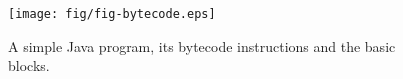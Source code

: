 \begin{figure}[!ht]
\begin{center}
\texttt{[image: fig/fig-bytecode.eps]}
\caption{A simple Java program, its bytecode instructions and the
basic blocks.}\label{fig-bytecode}
\end{center}
\end{figure}


\begin{comment}
\scriptsize
\begin{tabular}{lll}
\begin{minipage}{0.3\textwidth}
\begin{verbatim}

01 public class Vet {
02     int v[];
03     float out;
04
05     float average( int[] in )
06     {
07         v = in;
08         out = 0.0f;
09         int i = 0;
10         try {
11             while ( i < v.length )
12             {
13                 out += v[i];
14                 i++;
15             }
16             out = out / i;
17         }
18         catch( Exception e )
19         {
20             out = 0.0f;
21             i = 0;
22         }
23         finally
24         {
25             v = null;
26         }
27         print( (float) i );
28         return out;
29     }
30
31     public void print( float n )
32     {
33         System.out.print( n + "\n" );
34     }
35 }

\end{verbatim}
\end{minipage}
&
\begin{minipage}{0.3\textwidth}
\begin{verbatim}
0:    aload_0
1:    aload_1
2:    putfield      Vet.v
5:    aload_0
6:    fconst_0
7:    putfield      Vet.out
10:   iconst_0
11:   istore_2
12:   goto          #34
15:   aload_0
16:   dup
17:   getfield      Vet.out
20:   aload_0
21:   getfield      Vet.v
24:   iload_2
25:   iaload
26:   i2f
27:   fadd
28:   putfield      Vet.out
31:   iinc          %2    1
34:   iload_2
35:   aload_0
36:   getfield      Vet.v
39:   arraylength
40:   if_icmplt     #15
43:   aload_0
44:   aload_0
45:   getfield      Vet.out
48:   iload_2
49:   i2f
50:   fdiv
51:   putfield      Vet.out
54:   jsr           #82
57:   goto          #91
60:   astore_3
61:   aload_0
62:   fconst_0
63:   putfield      Vet.out
66:   iconst_0
67:   istore_2
68:   jsr           #82
71:   goto          #91
74:   astore        %4
76:   jsr           #82
79:   aload         %4
81:   athrow
82:   astore        %5
84:   aload_0
85:   aconst_null
86:   putfield      Vet.v
89:   ret           %5
91:   aload_0
92:   iload_2
93:   i2f
94:   invokevirtual Vet.print
97:   aload_0
98:   getfield      Vet.out
101:  freturn
\end{verbatim}
\end{minipage}
\end{tabular}
\end{center}
\caption{A simple Java program, its bytecode instructions and the basic blocks.}\label{fig-bytecode}
\end{figure}
\end{comment}

